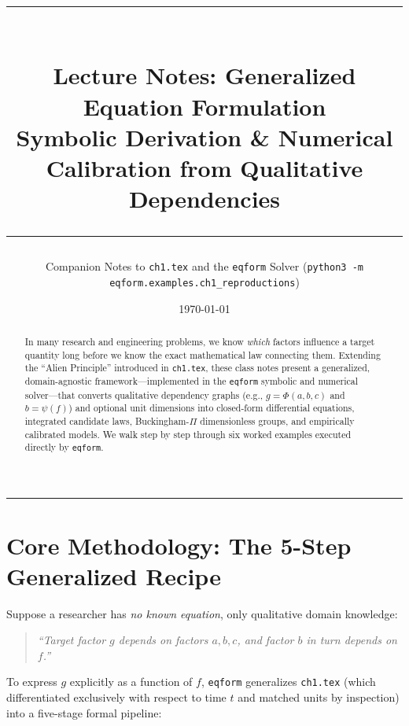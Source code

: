 \documentclass[11pt,a4paper]{article}
\title{
  {\color{navy}\rule{\textwidth}{1.8pt}}\\[0.6em]
  {\LARGE\bfseries\color{navy} Lecture Notes: Generalized Equation Formulation}\\[0.3em]
  {\large\color{slate} Symbolic Derivation \& Numerical Calibration from Qualitative Dependencies}\\[0.4em]
  {\color{navy}\rule{\textwidth}{0.8pt}}
}
\author{Companion Notes to \texttt{ch1.tex} and the \texttt{eqform} Solver (\texttt{python3 -m eqform.examples.ch1\_reproductions})}
\date{\today}
\begin{document}
\maketitle

\begin{abstract}
\noindent In many research and engineering problems, we know \emph{which} factors influence a target quantity long before we know the exact mathematical law connecting them. Extending the ``Alien Principle'' introduced in \texttt{ch1.tex}, these class notes present a generalized, domain-agnostic framework—implemented in the \texttt{eqform} symbolic and numerical solver—that converts qualitative dependency graphs (e.g., $g = \Phi(a,b,c)$ and $b = \psi(f)$) and optional unit dimensions into closed-form differential equations, integrated candidate laws, Buckingham-$\Pi$ dimensionless groups, and empirically calibrated models. We walk step by step through six worked examples executed directly by \texttt{eqform}.
\end{abstract}

\tableofcontents
\vspace{0.8em}
\hrule
\vspace{1em}

\section{Core Methodology: The 5-Step Generalized Recipe}

Suppose a researcher has \emph{no known equation}, only qualitative domain knowledge:
\begin{quote}
\emph{``Target factor $g$ depends on factors $a, b, c$, and factor $b$ in turn depends on $f$.''}
\end{quote}
To express $g$ explicitly as a function of $f$, \texttt{eqform} generalizes \texttt{ch1.tex} (which differentiated exclusively with respect to time $t$ and matched units by inspection) into a five-stage formal pipeline:
\end{document}
